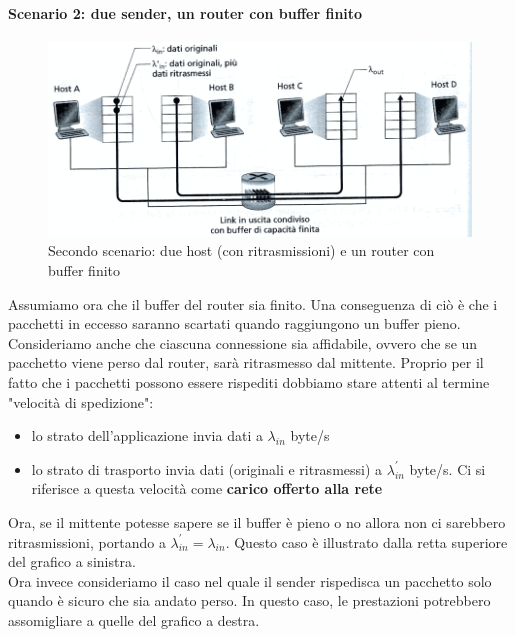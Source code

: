 \documentclass[11pt,a4paper]{book}
\begin{document}
\paragraph{Scenario 2: due sender, un router con buffer finito}
\begin{figure}
	\includegraphics[scale=0.6]{img/041.png}
	\caption{Secondo scenario: due host (con ritrasmissioni) e un router con buffer finito}
\end{figure}
Assumiamo ora che il buffer del router sia finito. Una conseguenza di ciò è che i pacchetti in eccesso saranno scartati quando raggiungono un buffer pieno. Consideriamo anche che ciascuna connessione sia affidabile, ovvero che se un pacchetto viene perso dal router, sarà ritrasmesso dal mittente. Proprio per il fatto che i pacchetti possono essere rispediti dobbiamo stare attenti al termine "velocità di spedizione":
\begin{itemize}
	\item lo strato dell'applicazione invia dati a $\lambda_{in}$ byte/s
	\item lo strato di trasporto invia dati (originali e ritrasmessi) a $\lambda_{in}^{'}$ byte/s. Ci si riferisce a questa velocità come \textbf{carico offerto alla rete}
\end{itemize}
Ora, se il mittente potesse sapere se il buffer è pieno o no allora non ci sarebbero ritrasmissioni, portando a $\lambda_{in}^{'} = \lambda_{in}$. Questo caso è illustrato dalla retta superiore del grafico a sinistra. \\
Ora invece consideriamo il caso nel quale il sender rispedisca un pacchetto solo quando è sicuro che sia andato perso. In questo caso, le prestazioni potrebbero assomigliare a quelle del grafico a destra.
\end{document}

